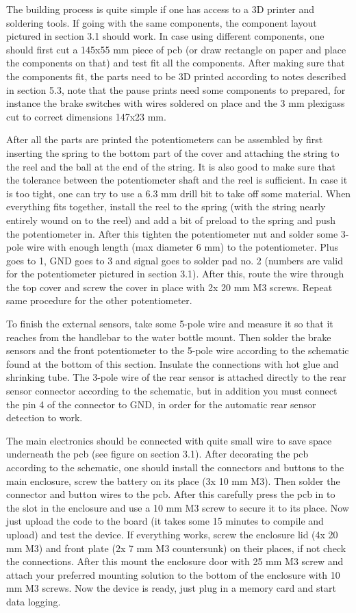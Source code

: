 \documentclass[a4paper,11pt]{article}
\begin{document}
The building process is quite simple if one has access to a 3D printer and soldering tools. If going with the same components, the component layout pictured in section 3.1 should work. In case using different components, one should first cut a 145x55 mm piece of pcb (or draw rectangle on paper and place the components on that) and test fit all the components. After making sure that the components fit, the parts need to be 3D printed according to notes described in section 5.3, note that the pause prints need some components to prepared, for instance the brake switches with wires soldered on place and the 3 mm plexigass cut to correct dimensions 147x23 mm.

After all the parts are printed the potentiometers can be assembled by first inserting the spring to the bottom part of the cover and attaching the string to the reel and the ball at the end of the string. It is also good to make sure that the tolerance between the potentiometer shaft and the reel is sufficient. In case it is too tight, one can try to use a 6.3 mm drill bit to take off some material. When everything fits together, install the reel to the spring (with the string nearly entirely wound on to the reel) and add a bit of preload to the spring and push the potentiometer in. After this tighten the potentiometer nut and solder some 3-pole wire with enough length (max diameter 6 mm) to the potentiometer. Plus goes to 1, GND goes to 3 and signal goes to solder pad no. 2 (numbers are valid for the potentiometer pictured in section 3.1). After this, route the wire through the top cover and screw the cover in place with 2x 20 mm M3 screws. Repeat same procedure for the other potentiometer.

To finish the external sensors, take some 5-pole wire and measure it so that it reaches from the handlebar to the water bottle mount. Then solder the brake sensors and the front potentiometer to the 5-pole wire according to the schematic found at the bottom of this section. Insulate the connections with hot glue and shrinking tube. The 3-pole wire of the rear sensor is attached directly to the rear sensor connector according to the schematic, but in addition you must connect the pin 4 of the connector to GND, in order for the automatic rear sensor detection to work.

The main electronics should be connected with quite small wire to save space underneath the pcb (see figure on section 3.1). After decorating the pcb according to the schematic, one should install the connectors and buttons to the main enclosure, screw the battery on its place (3x 10 mm M3). Then solder the connector and button wires to the pcb. After this carefully press the pcb in to the slot in the enclosure and use a 10 mm M3 screw to secure it to its place. Now just upload the code to the board (it takes some 15 minutes to compile and upload) and test the device. If everything works, screw the enclosure lid (4x 20 mm M3) and front plate (2x 7 mm M3 countersunk) on their places, if not check the connections. After this mount the enclosure door with 25 mm M3 screw and attach your preferred mounting solution to the bottom of the enclosure with 10 mm M3 screws. Now the device is ready, just plug in a memory card and start data logging.
\end{document}
